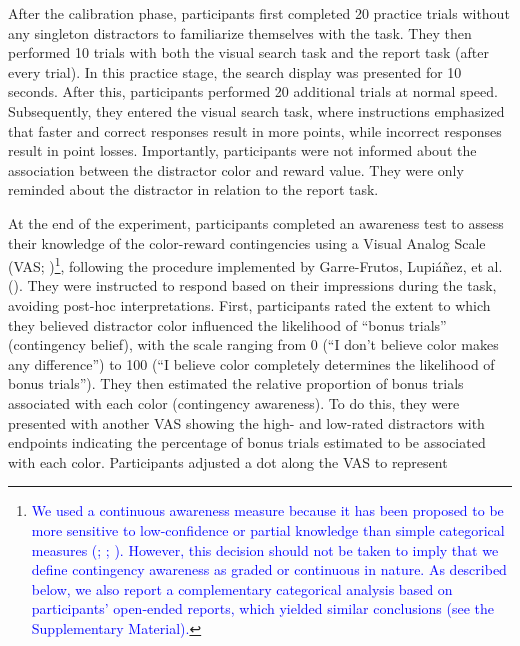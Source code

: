 \documentclass[
  man,
  floatsintext,
  longtable,
  nolmodern,
  notxfonts,
  notimes,
  mask,
  colorlinks=true,linkcolor=blue,citecolor=blue,urlcolor=blue]{apa7}
\begin{document}
After the calibration phase, participants first completed 20 practice
trials without any singleton distractors to familiarize themselves with
the task. They then performed 10 trials with both the visual search task
and the report task (after every trial). In this practice stage, the
search display was presented for 10 seconds. After this, participants
performed 20 additional trials at normal speed. Subsequently, they
entered the visual search task, where instructions emphasized that
faster and correct responses result in more points, while incorrect
responses result in point losses. Importantly, participants were not
informed about the association between the distractor color and reward
value. They were only reminded about the distractor in relation to the
report task.

At the end of the experiment, participants completed an awareness test
to assess their knowledge of the color-reward contingencies using a
Visual Analog Scale (VAS; )\footnote{\textcolor{blue}{We used a continuous awareness measure
  because it has been proposed to be more sensitive to low-confidence or
  partial knowledge than simple categorical measures
  (;
  ;
  ).
  However, this decision should not be taken to imply that we define
  contingency awareness as graded or continuous in nature. As described
  below, we also report a complementary categorical analysis based on
  participants' open-ended reports, which yielded similar conclusions
  (see the Supplementary Material).}}, following the procedure
implemented by Garre-Frutos, Lupiáñez, et al.
(). They were instructed to
respond based on their impressions during the task, avoiding post-hoc
interpretations. First, participants rated the extent to which they
believed distractor color influenced the likelihood of ``bonus trials''
(contingency belief), with the scale ranging from 0 (``I don't believe
color makes any difference'') to 100 (``I believe color completely
determines the likelihood of bonus trials''). They then estimated the
relative proportion of bonus trials associated with each color
(contingency awareness). To do this, they were presented with another
VAS showing the high- and low-rated distractors with endpoints
indicating the percentage of bonus trials estimated to be associated
with each color. Participants adjusted a dot along the VAS to represent
\end{document}
